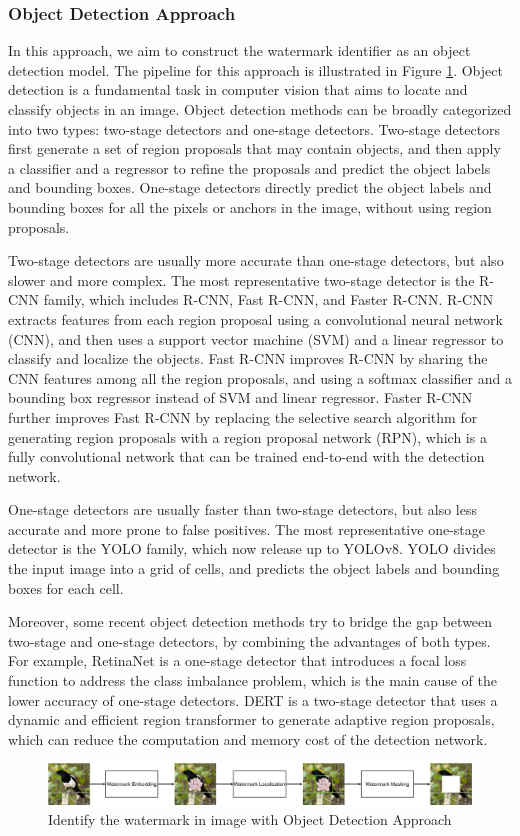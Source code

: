\subsubsection{Object Detection Approach}
In this approach, we aim to construct the watermark identifier as an object detection model. The pipeline for this approach is illustrated in Figure \ref{figure:detection}. Object detection is a fundamental task in computer vision that aims to locate and classify objects in an image. Object detection methods can be broadly categorized into two types: two-stage detectors and one-stage detectors. Two-stage detectors first generate a set of region proposals that may contain objects, and then apply a classifier and a regressor to refine the proposals and predict the object labels and bounding boxes. One-stage detectors directly predict the object labels and bounding boxes for all the pixels or anchors in the image, without using region proposals.

Two-stage detectors are usually more accurate than one-stage detectors, but also slower and more complex. The most representative two-stage detector is the R-CNN family, which includes R-CNN, Fast R-CNN, and Faster R-CNN. R-CNN extracts features from each region proposal using a convolutional neural network (CNN), and then uses a support vector machine (SVM) and a linear regressor to classify and localize the objects. Fast R-CNN improves R-CNN by sharing the CNN features among all the region proposals, and using a softmax classifier and a bounding box regressor instead of SVM and linear regressor. Faster R-CNN further improves Fast R-CNN by replacing the selective search algorithm for generating region proposals with a region proposal network (RPN), which is a fully convolutional network that can be trained end-to-end with the detection network.

One-stage detectors are usually faster than two-stage detectors, but also less accurate and more prone to false positives. The most representative one-stage detector is the YOLO family, which now release up to YOLOv8. YOLO divides the input image into a grid of cells, and predicts the object labels and bounding boxes for each cell.

Moreover, some recent object detection methods try to bridge the gap between two-stage and one-stage detectors, by combining the advantages of both types. For example, RetinaNet  is a one-stage detector that introduces a focal loss function to address the class imbalance problem, which is the main cause of the lower accuracy of one-stage detectors. DERT  is a two-stage detector that uses a dynamic and efficient region transformer to generate adaptive region proposals, which can reduce the computation and memory cost of the detection network.
\begin{figure}[H]
 \centering
 \includegraphics[width=\linewidth]{img/detection.png}

 \caption{Identify the watermark in image with Object Detection Approach}
 \label{figure:detection}
\end{figure}

